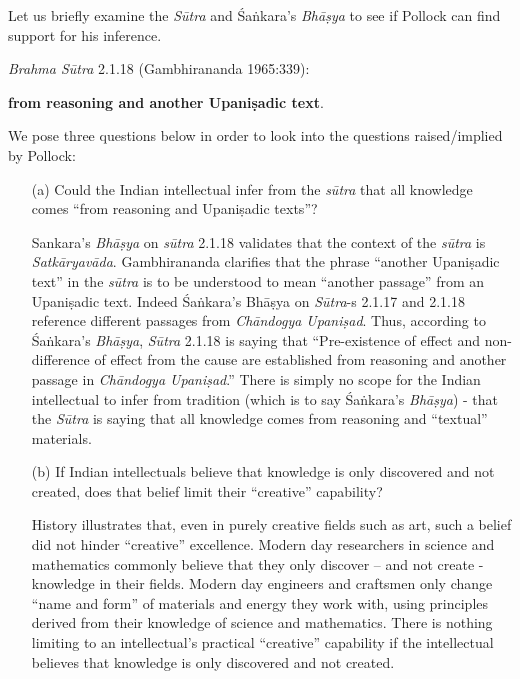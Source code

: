 Let us briefly examine the {\sl Sūtra} and Śaṅkara's {\sl Bhāṣya} to see if Pollock can find support for his inference.

{\sl Brahma Sūtra} 2.1.18 (Gambhirananda 1965:339):
\begin{myquote}
 \textbf{from reasoning and another Upaniṣadic text}.
\end{myquote}

We pose three questions below in order to look into the questions raised/implied by Pollock:
\begin{itemize}
\item[(a)] Could the Indian intellectual infer from the {\sl sūtra} that all knowledge comes ``from reasoning and Upaniṣadic texts''?

Sankara's {\sl Bhāṣya} on {\sl sūtra} 2.1.18 validates that the context of the {\sl sūtra} is {\sl Satkāryavāda}.  Gambhirananda clarifies that the phrase ``another Upaniṣadic text'' in the {\sl sūtra} is to be understood to mean ``another passage'' from an Upaniṣadic text. Indeed Śaṅkara's Bhāṣya on {\sl Sūtra}-s 2.1.17 and 2.1.18 reference different passages from {\sl Chāndogya Upaniṣad}. Thus, according to Śaṅkara's {\sl Bhāṣya}, {\sl Sūtra} 2.1.18 is saying that ``Pre-existence of effect and non-difference of effect from the cause are established from reasoning and another passage in {\sl Chāndogya Upaniṣad}.''  There is simply no scope for the Indian intellectual to infer from tradition (which is to say Śaṅkara's {\sl Bhāṣya}) - that the {\sl Sūtra} is saying that all knowledge comes from reasoning and ``textual'' materials.

\item[(b)] If Indian intellectuals believe that knowledge is only discovered and not created, does that belief limit their ``creative'' capability?

History illustrates that, even in purely creative fields such as art, such a belief did not hinder ``creative'' excellence.  Modern day researchers in science and mathematics commonly believe that they only discover -- and not create - knowledge in their fields.  Modern day engineers and craftsmen only change ``name and form'' of materials and energy they work with, using principles derived from their knowledge of science and mathematics. There is nothing limiting to an intellectual's practical ``creative'' capability if the intellectual believes that knowledge is only discovered and not created.


\end{itemize}
